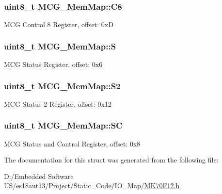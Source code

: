 \subsubsection[{C8}]{\setlength{\rightskip}{0pt plus 5cm}uint8\+\_\+t M\+C\+G\+\_\+\+Mem\+Map\+::\+C8}\label{struct_m_c_g___mem_map_a346a8b8c5c2c675e6297aaa1f14798df}
M\+C\+G Control 8 Register, offset\+: 0x\+D \hypertarget{struct_m_c_g___mem_map_a65ee0333e0d5c462c7dd8c2402bf93be}{}
\subsubsection[{S}]{\setlength{\rightskip}{0pt plus 5cm}uint8\+\_\+t M\+C\+G\+\_\+\+Mem\+Map\+::\+S}\label{struct_m_c_g___mem_map_a65ee0333e0d5c462c7dd8c2402bf93be}
M\+C\+G Status Register, offset\+: 0x6 \hypertarget{struct_m_c_g___mem_map_a97d548f46a8b3fa3cd094dbbd5e579af}{}
\subsubsection[{S2}]{\setlength{\rightskip}{0pt plus 5cm}uint8\+\_\+t M\+C\+G\+\_\+\+Mem\+Map\+::\+S2}\label{struct_m_c_g___mem_map_a97d548f46a8b3fa3cd094dbbd5e579af}
M\+C\+G Status 2 Register, offset\+: 0x12 \hypertarget{struct_m_c_g___mem_map_aeff584aa52340d7c66dc06789ad05310}{}
\subsubsection[{S\+C}]{\setlength{\rightskip}{0pt plus 5cm}uint8\+\_\+t M\+C\+G\+\_\+\+Mem\+Map\+::\+S\+C}\label{struct_m_c_g___mem_map_aeff584aa52340d7c66dc06789ad05310}
M\+C\+G Status and Control Register, offset\+: 0x8 

The documentation for this struct was generated from the following file\+:\begin{DoxyCompactItemize}
\item 
D\+:/\+Embedded Software U\+S/es18aut13/\+Project/\+Static\+\_\+\+Code/\+I\+O\+\_\+\+Map/\hyperlink{_m_k70_f12_8h}{M\+K70\+F12.\+h}\end{DoxyCompactItemize}
